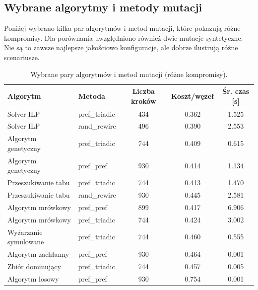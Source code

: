 \subsection{Wybrane algorytmy i metody mutacji}
Poniżej wybrano kilka par algorytmów i metod mutacji, które pokazują różne kompromisy. Dla porównania uwzględniono również dwie mutacje syntetyczne. Nie są to zawsze najlepsze jakościowo konfiguracje, ale dobrze ilustrują różne scenariusze.

\begin{table}[H]
  \centering
  \caption{Wybrane pary algorytmów i metod mutacji (różne kompromisy).}
  \label{tab:dyn-synth-selected-best}
  \begin{tabular}{llccc}
    \toprule
    \textbf{Algorytm}     & \textbf{Metoda} & \textbf{Liczba kroków} & \textbf{Koszt/węzeł} & \textbf{Śr. czas [s]} \\
    \midrule
    Solver ILP            & pref\_triadic   & 434                    & 0.362                & 1.525                 \\
    Solver ILP            & rand\_rewire    & 496                    & 0.390                & 2.553                 \\
    Algorytm genetyczny   & pref\_triadic   & 744                    & 0.409                & 0.615                 \\
    Algorytm genetyczny   & pref\_pref      & 930                    & 0.414                & 1.134                 \\
    Przeszukiwanie tabu   & pref\_triadic   & 744                    & 0.413                & 1.470                 \\
    Przeszukiwanie tabu   & rand\_rewire    & 930                    & 0.445                & 2.581                 \\
    Algorytm mrówkowy     & pref\_pref      & 899                    & 0.417                & 6.906                 \\
    Algorytm mrówkowy     & pref\_triadic   & 744                    & 0.424                & 3.002                 \\
    Wyżarzanie symulowane & pref\_triadic   & 744                    & 0.460                & 0.555                 \\
    Algorytm zachłanny    & pref\_pref      & 930                    & 0.464                & 0.001                 \\
    Zbiór dominujący      & pref\_triadic   & 744                    & 0.457                & 0.005                 \\
    Algorytm losowy       & pref\_pref      & 930                    & 0.754                & 0.001                 \\
    \bottomrule
  \end{tabular}
\end{table}

